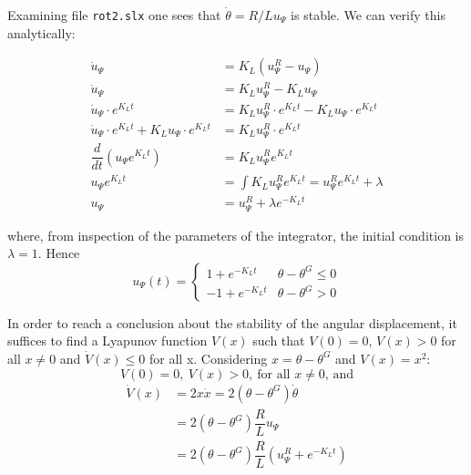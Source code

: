 Examining file \texttt{rot2.slx} one sees that $\dot{\theta} = R/L u_{\Psi}$ is
stable. We can verify this analytically:

\begin{align*}
  \dot{u}_{\Psi} &= K_L (u_{\Psi}^R - u_{\Psi})  \\
  \dot{u}_{\Psi} &= K_L u_{\Psi}^R - K_L u_{\Psi}  \\
  \dot{u}_{\Psi} \cdot e^{K_L t} &= K_L u_{\Psi}^R \cdot e^{K_L t} - K_L u_{\Psi} \cdot e^{K_L t}  \\
  \dot{u}_{\Psi} \cdot e^{K_L t} + K_L u_{\Psi} \cdot e^{K_L t} &= K_L u_{\Psi}^R \cdot e^{K_L t} \\
  \dfrac{d}{dt}(u_{\Psi} e^{K_L t}) &= K_L u_{\Psi}^R e^{K_L t} \\
  u_{\Psi} e^{K_L t} &= \int K_L u_{\Psi}^R e^{K_L t} = u_{\Psi}^R e^{K_L t} + \lambda \\
  u_{\Psi} &= u_{\Psi}^R + \lambda e^{-K_L t}
\end{align*}

where, from inspection of the parameters of the integrator, the initial
condition is $\lambda = 1$. Hence
\begin{equation}
  u_{\Psi}(t) = \left\{
    \begin{matrix}
    1 + e^{-K_L t} & \theta - \theta^G \leq 0 \\
    -1 +e^{-K_L t} & \theta - \theta^G > 0
    \end{matrix}\right.
\end{equation}

In order to reach a conclusion about the stability of the angular displacement,
it suffices to find a Lyapunov function $V(x)$ such that $V(0) = 0$, $V(x) > 0$
for all $x \neq 0$ and $\dot{V}(x) \leq 0$ for all x. Considering
$x = \theta - \theta^G$ and $V(x) = x^2$:
$$V(0) = 0,\ V(x) > 0,\ \text{for all } x \neq 0\text{, and}$$
\begin{align*}
  \dot{V}(x) &= 2 x \dot{x} = 2 (\theta - \theta^G) \dot{\theta}  \\
             &= 2 (\theta - \theta^G) \dfrac{R}{L} u_{\Psi} \\
             &= 2 (\theta - \theta^G) \dfrac{R}{L} (u_{\Psi}^R + e^{-K_L t})
\end{align*}

